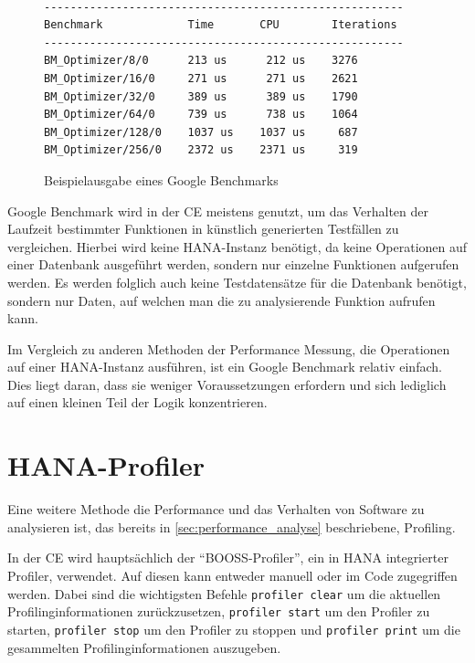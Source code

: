 \begin{figure}[h]
    \begin{center}
        \begin{BVerbatim}

-------------------------------------------------------
Benchmark             Time       CPU        Iterations 
-------------------------------------------------------
BM_Optimizer/8/0      213 us      212 us    3276
BM_Optimizer/16/0     271 us      271 us    2621
BM_Optimizer/32/0     389 us      389 us    1790
BM_Optimizer/64/0     739 us      738 us    1064
BM_Optimizer/128/0    1037 us    1037 us     687
BM_Optimizer/256/0    2372 us    2371 us     319
        \end{BVerbatim}
    \end{center}
    \caption{Beispielausgabe eines Google Benchmarks}\label{fig:google_benchmark_ausgabe} 
\end{figure}
Google Benchmark wird in der \ac{CE} meistens genutzt, um das Verhalten der
Laufzeit bestimmter Funktionen in künstlich generierten Testfällen zu
vergleichen. Hierbei wird keine HANA-Instanz benötigt, da
keine Operationen auf einer Datenbank ausgeführt werden, sondern nur einzelne
Funktionen aufgerufen werden. Es werden folglich
auch keine Testdatensätze für die Datenbank benötigt, sondern nur Daten, auf
welchen man die zu analysierende Funktion aufrufen kann.

Im Vergleich zu anderen Methoden der Performance Messung, die Operationen auf
einer HANA-Instanz ausführen, ist ein Google Benchmark relativ einfach.
Dies liegt daran, dass sie weniger Voraussetzungen erfordern und sich lediglich
auf einen kleinen Teil der Logik konzentrieren.


\section{HANA-Profiler}
\label{sec:hana_profiler}

Eine weitere Methode die Performance und das Verhalten von Software zu
analysieren ist, das bereits in \autoref{sec:performance_analyse}
beschriebene, Profiling.

In der \ac{CE} wird hauptsächlich der \enquote{BOOSS-Profiler}, ein in HANA
integrierter Profiler, verwendet. Auf diesen kann entweder manuell oder im Code
zugegriffen werden. Dabei sind die wichtigsten Befehle \verb+profiler clear+
um die aktuellen Profilinginformationen zurückzusetzen, \verb+profiler start+
um den Profiler zu starten, \verb+profiler stop+ um den Profiler zu
stoppen und \verb+profiler print+ um die gesammelten Profilinginformationen
auszugeben.

